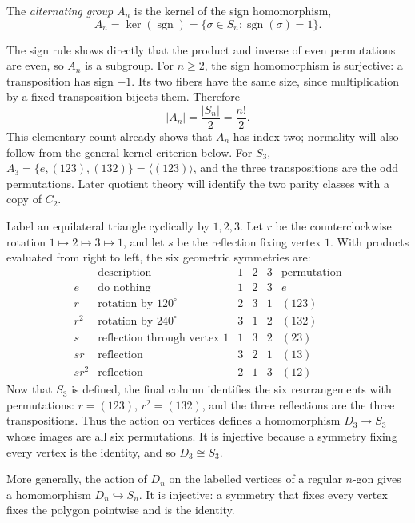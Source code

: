 \begin{definition}
The \emph{alternating group} \(A_n\) is the kernel of the sign homomorphism,
\[
A_n=\ker(\operatorname{sgn})=\{\sigma\in S_n:\operatorname{sgn}(\sigma)=1\}.
\]
\end{definition}

The sign rule shows directly that the product and inverse of even permutations
are even, so \(A_n\) is a subgroup. For \(n\geq2\), the sign homomorphism is
surjective: a transposition has sign \(-1\). Its two fibers have the same
size, since multiplication by a fixed transposition bijects them. Therefore
\[
|A_n|=\frac{|S_n|}{2}=\frac{n!}{2}.
\]
This elementary count already shows that \(A_n\) has index two; normality will
also follow from the general kernel criterion below.
For \(S_3\), \(A_3=\{e,(123),(132)\}=\langle(123)\rangle\), and the three transpositions are
the odd permutations.  Later quotient theory will identify the two parity
classes with a copy of \(C_2\).

\begin{example}
Label an equilateral triangle cyclically by \(1,2,3\). Let \(r\) be the
counterclockwise rotation \(1\mapsto2\mapsto3\mapsto1\), and let \(s\) be the
reflection fixing vertex \(1\). With products evaluated from right to left,
the six geometric symmetries are:
\[
\begin{array}{c|c|ccc|c}
 &\text{description}&1&2&3&\text{permutation}\\\hline
e&\text{do nothing}&1&2&3&e\\
r&\text{rotation by }120^\circ&2&3&1&(123)\\
r^2&\text{rotation by }240^\circ&3&1&2&(132)\\
s&\text{reflection through vertex }1&1&3&2&(23)\\
sr&\text{reflection}&3&2&1&(13)\\
sr^2&\text{reflection}&2&1&3&(12)
\end{array}
\]
Now that \(S_3\) is defined, the final column identifies the six
rearrangements with permutations: \(r=(123)\), \(r^2=(132)\), and the three
reflections are the three transpositions. Thus the action on vertices defines
a homomorphism \(D_3\to S_3\) whose images are all six permutations. It is
injective because a symmetry fixing every vertex is the identity, and so
\(D_3\cong S_3\).
\end{example}

More generally, the action of \(D_n\) on the labelled vertices of a regular
\(n\)-gon gives a homomorphism \(D_n\hookrightarrow S_n\). It is injective:
a symmetry that fixes every vertex fixes the polygon pointwise and is the
identity.

